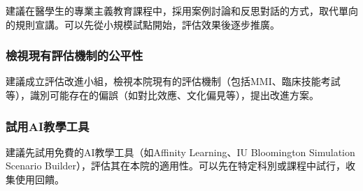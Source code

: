 \documentclass[12pt,a4paper]{article}
\begin{document}
建議在醫學生的專業主義教育課程中，採用案例討論和反思對話的方式，取代單向的規則宣講。可以先從小規模試點開始，評估效果後逐步推廣。

\subsubsection{檢視現有評估機制的公平性}

建議成立評估改進小組，檢視本院現有的評估機制（包括MMI、臨床技能考試等），識別可能存在的偏誤（如對比效應、文化偏見等），提出改進方案。

\subsubsection{試用AI教學工具}

建議先試用免費的AI教學工具（如Affinity Learning、IU Bloomington Simulation Scenario Builder），評估其在本院的適用性。可以先在特定科別或課程中試行，收集使用回饋。





\end{document}
